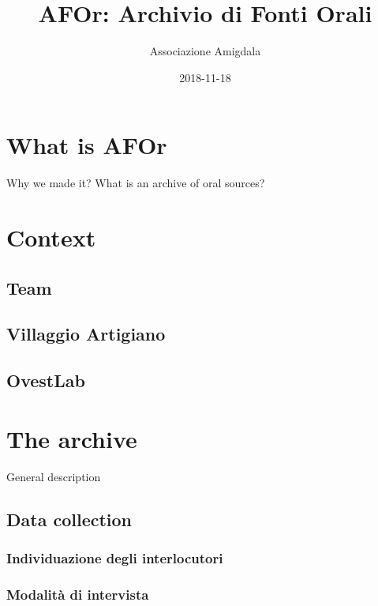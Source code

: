 \documentclass[]{book}
\title{AFOr: Archivio di Fonti Orali}
\author{Associazione Amigdala}
\date{2018-11-18}
\begin{document}
\maketitle

{
\setcounter{tocdepth}{1}
\tableofcontents
}
\chapter*{What is AFOr}\label{what-is-afor}

Why we made it? What is an archive of oral sources?

\chapter{Context}\label{context}

\section{Team}\label{team}

\section{Villaggio Artigiano}\label{villaggio-artigiano}

\section{OvestLab}\label{ovestlab}

\chapter{The archive}\label{archive}

General description

\section{Data collection}\label{data-collection}

\subsection{Individuazione degli
interlocutori}\label{individuazione-degli-interlocutori}

\subsection{Modalità di intervista}\label{modalita-di-intervista}
\end{document}
